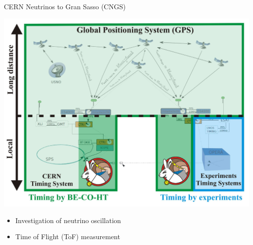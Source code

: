 \documentclass[compress,red]{beamer}
\begin{document}
\begin{frame}{CERN Neutrinos to Gran Sasso (CNGS)}

    \begin{center}
      \includegraphics[height=0.7\textheight]{applications/cngs-timing-31.pdf}
    \end{center}

    \begin{center}
      \begin{itemize}
	\item Investigation of neutrino oscillation
	\item Time of Flight (ToF) measurement
      \end{itemize}

    \end{center}


\end{frame}
% 
\end{document}
